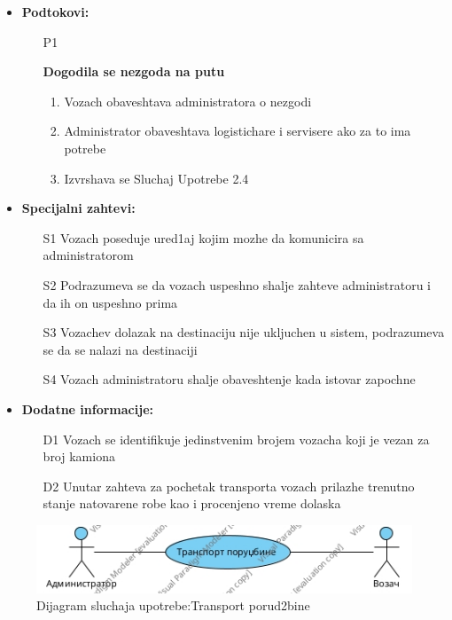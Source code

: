 \begin{itemize}
{\begin{itemize}
{	}
		\end{itemize}
					}

	\item{\textbf{Podtokovi:}
		\begin{itemize}
			\item[P{1}]{\textbf{Dogodila se nezgoda na putu }
				\begin{enumerate}
					\item{Vozach obaveshtava administratora o nezgodi}
					\item{Administrator obaveshtava logistichare i servisere ako za to ima potrebe}
					\item{Izvrshava se Sluchaj Upotrebe 2.4}
				\end{enumerate}
							}
		\end{itemize}
			}
	\item{\textbf{Specijalni zahtevi:} \begin{itemize}
			\item[S{1}]{Vozach poseduje ured1aj kojim mozhe da komunicira sa administratorom}
			\item[S{2}]{Podrazumeva se da vozach uspeshno shalje zahteve administratoru i da ih on uspeshno prima}
			\item[S{3}]{Vozachev dolazak na destinaciju nije ukljuchen u sistem, podrazumeva se da se nalazi na destinaciji}
			\item[S{4}]{Vozach administratoru shalje obaveshtenje kada istovar zapochne}
		\end{itemize}}
	\item{\textbf{Dodatne informacije:}
			\begin{itemize}
				\item[D{1}]{Vozach se identifikuje jedinstvenim brojem vozacha koji je vezan za broj kamiona}
				\item[D{2}]{Unutar zahteva za pochetak transporta vozach prilazhe trenutno stanje natovarene robe kao i procenjeno vreme dolaska}
			\end{itemize}
		}
\end{itemize}
\begin{figure}[h!]
	\includegraphics[scale=0.5]{Slike/SUdostavljanjePorudzbineUseCase}
	\centering
	\caption{Dijagram sluchaja upotrebe:Transport porud2bine}
	\label{ucDostavljanje}
\end{figure}
